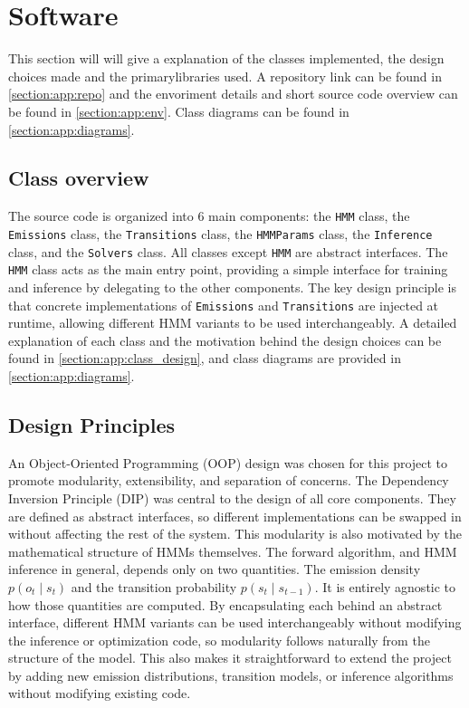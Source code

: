\section{Software}
This section will will give a explanation of the classes implemented, the design choices made and the primarylibraries used.
A repository link can be found in \ref{section:app:repo} and the envoriment details and short source code overview can be found in \ref{section:app:env}.
Class diagrams can be found in \ref{section:app:diagrams}.
\subsection{Class overview}
The source code is organized into 6 main components: the \texttt{HMM} class, the \texttt{Emissions} class, the \texttt{Transitions} class, the \texttt{HMMParams} class, the \texttt{Inference} class, and the \texttt{Solvers} class.
All classes except \texttt{HMM} are abstract interfaces.
The \texttt{HMM} class acts as the main entry point, providing a simple interface for training and inference by delegating to the other components.
The key design principle is that concrete implementations of \texttt{Emissions} and \texttt{Transitions} are injected at runtime, allowing different HMM variants to be used interchangeably.
A detailed explanation of each class and the motivation behind the design choices can be found in \ref{section:app:class_design}, and class diagrams are provided in \ref{section:app:diagrams}.


\subsection{Design Principles}
An Object-Oriented Programming (OOP) design was chosen for this project to promote modularity, extensibility, and separation of concerns.
The Dependency Inversion Principle (DIP) was central to the design of all core components. They are defined as abstract interfaces, so different implementations can be swapped in without affecting the rest of the system.
This modularity is also motivated by the mathematical structure of HMMs themselves.
The forward algorithm, and HMM inference in general, depends only on two quantities. The emission density $p(o_t \mid s_t)$ and the transition probability $p(s_t \mid s_{t-1})$.
It is entirely agnostic to how those quantities are computed.
By encapsulating each behind an abstract interface, different HMM variants can be used interchangeably without modifying the inference or optimization code, so modularity follows naturally from the structure of the model.
This also makes it straightforward to extend the project by adding new emission distributions, transition models, or inference algorithms without modifying existing code.\newline
